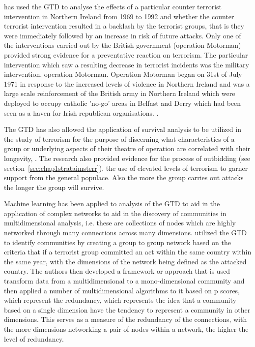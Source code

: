 \citep{lafree2009impact} has used the GTD to analyse the effects of a particular counter terrorist intervention in Northern Ireland from 1969 to 1992 and whether the counter terrorist intervention resulted in a backlash by the terrorist groups, that is they were immediately followed by an increase in risk of future attacks. Only one of the interventions carried out by the British government (operation Motorman) provided strong evidence for a preventative reaction on  terrorism. The particular intervention which saw a resulting decrease in terrorist incidents was the military intervention, operation Motorman. 
Operation Motorman began on  31st of July 1971 in response to the increased levels of violence in Northern Ireland \citep{edwards2011northern} and was a large scale reinforcement of the British army in Northern Ireland which were deployed to occupy catholic 'no-go' areas in Belfast and Derry which had been seen as a haven for Irish republican organisations. \citep{neumann2003myth}.

The GTD has also allowed the application of survival analysis to be utilized in the study of terrorism for the purpose of discerning what characteristics of a group or underlying aspects of their theatre of operation are correlated with their longevity, \citep{young2014survival}. The  research also provided evidence for the  process of outbidding (see section~\ref{sec:chap1strataimsterr}),  the use of elevated levels of terrorism to garner support from the general populace. Also the more the group carries out attacks the longer the group will survive.

Machine learning has been applied to analysis of the GTD to aid in the application of complex networks to aid in the discovery of communities in multidimensional analysis, i.e. these are collections of nodes which are highly networked through many connections across many dimensions. \citep{berlingerio2011finding} utilized the GTD to identify communities by creating a group to group network based on the criteria that if a terrorist group committed an act within the same country within the same year, with the dimensions of the network being defined as the attacked country. The authors then developed a framework or approach that is used transform data from a multidimensional to a mono-dimensional community and then applied a number of multidimensional algorithms to it based on p scores, which represent the redundancy, which represents the idea that a community based on a single dimension have the tendency to represent a community in other dimensions. This serves as a measure of the redundancy of the connections, with the more 
dimensions networking a pair of nodes within a network, the higher the level of redundancy. 

